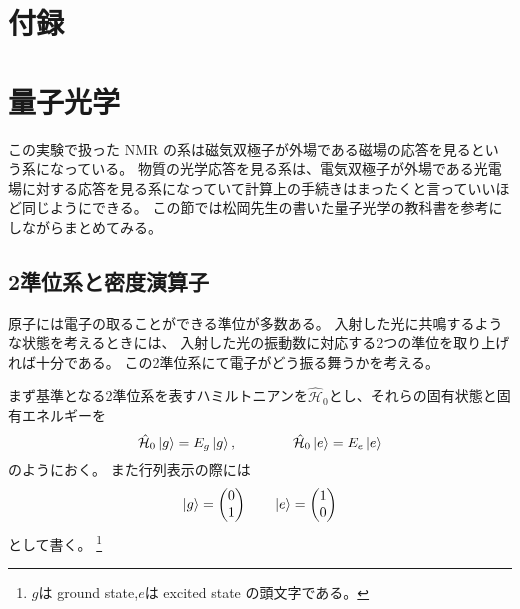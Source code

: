 \documentclass[11pt,dvipdfmx,a4paper]{jsarticle}
\begin{document}



\section*{付録}


\section{量子光学}
この実験で扱った NMR の系は磁気双極子が外場である磁場の応答を見るという系になっている。
物質の光学応答を見る系は、電気双極子が外場である光電場に対する応答を見る系になっていて計算上の手続きはまったくと言っていいほど同じようにできる。
この節では松岡先生の書いた量子光学の教科書\cite{Matsuoka_2000}を参考にしながらまとめてみる。
\subsection{2準位系と密度演算子}
原子には電子の取ることができる準位が多数ある。
入射した光に共鳴するような状態を考えるときには、
入射した光の振動数に対応する2つの準位を取り上げれば十分である。
この2準位系にて電子がどう振る舞うかを考える。

まず基準となる2準位系を表すハミルトニアンを\(\hat{\mathcal{H}}_0\)とし、それらの固有状態と固有エネルギーを
\begin{equation}
	\hat{\mathcal{H}}_0 \ket{g} = E_g \ket{g}, \qquad \qquad \hat{\mathcal{H}}_0 \ket{e} = E_e \ket{e}
\end{equation}
のようにおく。
また行列表示の際には
\begin{equation}
	\ket{g} =
	\begin{pmatrix}
		0\\
		1
	\end{pmatrix}
	\qquad
	\ket{e} =
	\begin{pmatrix}
		1 \\
		0
	\end{pmatrix}
\end{equation}
として書く。
\footnote{\(g\)は ground state,\(e\)は excited state の頭文字である。}
\end{document}
